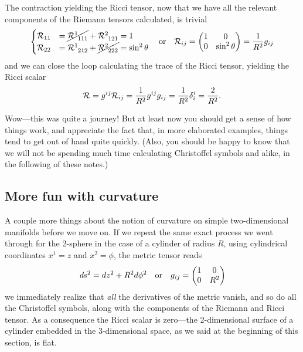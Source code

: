 The contraction yielding the Ricci tensor, now that we have all the relevant components
of the Riemann tensors calculated, is trivial
\begin{align*}
  \begin{cases}
  \ricci{11} & = \cancel{\riemann{1}{111}} + \riemann{2}{121} = 1\\
  \ricci{22} & = \riemann{1}{212} + \cancel{\riemann{2}{222}} = \sin^2\theta
  \end{cases}\quad\text{or}\quad
  \ricci{ij} =
  \begin{pmatrix}
    1 & 0\\
    0 & \sin^2\theta\\
  \end{pmatrix} = \frac{1}{R^2} g_{ij}
\end{align*}
and we can close the loop calculating the trace of the Ricci tensor, yielding the
Ricci scalar
\begin{align*}
  \mathcal{R}_{} = g^{ij} \mathcal{R}_{ij} = \frac{1}{R^2} g^{ij} g_{ij} =
  \frac{1}{R^2} \delta^i_i = \frac{2}{R^2}.
\end{align*}

Wow---this was quite a journey! But at least now you should get a sense of how things
work, and appreciate the fact that, in more elaborated examples, things tend to get out
of hand quite quickly. (Also, you should be happy to know that we will not be spending
much time calculating Christoffel symbols and alike, in the following of these notes.)



\subsection{More fun with curvature}

A couple more things about the notion of curvature on simple two-dimensional manifolds
before we move on. If we repeat the same exact process we went through for the
2-sphere in the case of a cylinder of radius $R$, using cylindrical coordinates
$x^1 = z$ and $x^2 = \phi$, the metric tensor reads
\begin{align*}
  \emph{d}s^2 = dz^2 + R^2 d\phi^2 \quad\text{or}\quad
  g_{ij} =
  \begin{pmatrix}
    1 & 0\\
    0 & R^2\\
  \end{pmatrix}
\end{align*}
we immediately realize that \emph{all} the derivatives of the metric vanish, and
so do all the Christoffel symbols, along with the components of the Riemann and
Ricci tensor. As a consequence the Ricci scalar is zero---the 2-dimensional surface
of a cylinder embedded in the 3-dimensional space, as we said at the beginning of
this section, is flat.

